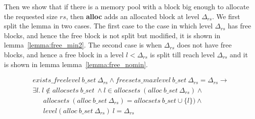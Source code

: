 Then we show that if there is a memory pool with a block big enough to allocate the requested size $rs$, then \textbf{alloc} adds an allocated block at level $\Delta_{rs}$. We first split the lemma in two cases. The first case to the case in which level $\Delta_{rs}$ has free blocks, and hence the free block is not split but modified, it is shown in lemma~\ref{lemma:free_min2}. The second case is when $\Delta_{rs}$ does not have free blocks, and hence a free block in a level $l < \Delta_{rs}$ is split till reach level $\Delta_{rs}$ and it is shown in lemma lemma~\ref{lemma:free_nomin}.



\begin{lemma} 
\label{lemma:free_min2}
\end{lemma}
\vspace{-7pt}
{\footnotesize
\begin{align*}
&exists\_freelevel\ b\_set\ \Delta_{rs} \wedge freesets\_maxlevel\ b\_set\ \Delta_{rs} = \Delta_{rs}\longrightarrow\\ 
& \exists l.\ l \notin allocsets\ b\_set\ \wedge l \in allocsets\ (alloc\ b\_set\ \Delta_{rs}) \wedge  \\
&\ \ \ \ \ \ \ allocsets\ (alloc\ b\_set\ \Delta_{rs}) = allocsets\ b\_set \cup \lbrace l \rbrace) \wedge  \\
&\ \ \ \ \ \ \ level (alloc\ b\_set\ \Delta_{rs})\ l = \Delta_{rs}
\end{align*}
}
\vspace{-12pt}


